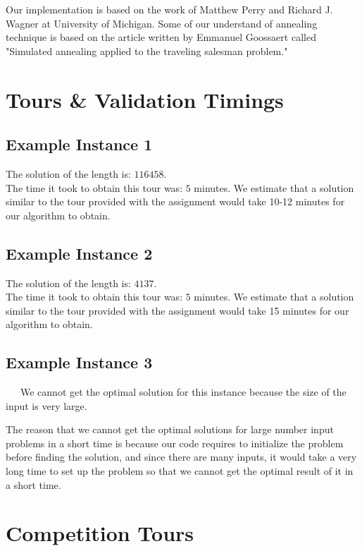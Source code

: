 \documentclass[11pt]{scrreprt}
\begin{document}
Our implementation is based on the work of Matthew Perry and Richard J. Wagner at University of Michigan. Some of our understand of annealing technique is based on the article written by Emmanuel Goossaert called "Simulated annealing applied to the traveling salesman problem."

\chapter{Tours \& Validation Timings}
\section{Example Instance 1}

The solution of the length is: $116458$.\\

The time it took to obtain this tour was: $5$ minutes. We estimate that a solution similar to the tour provided with the assignment would take 10-12 minutes for our algorithm to obtain.


\section{Example Instance 2}

The solution of the length is: $4137$.\\

The time it took to obtain this tour was: $5$ minutes. We estimate that a solution similar to the tour provided with the assignment would take 15 minutes for our algorithm to obtain.


\section{Example Instance 3}

\ \ \ We cannot get the optimal solution for this instance because the size of the input is very large.

The reason that we cannot get the optimal solutions for large number input problems in a short time is because our code requires to initialize the problem before finding the solution, and since there are many inputs, it would take a very long time to set up the problem so that we cannot get the optimal result of it in a short time.

\chapter{Competition Tours}
\end{document}
